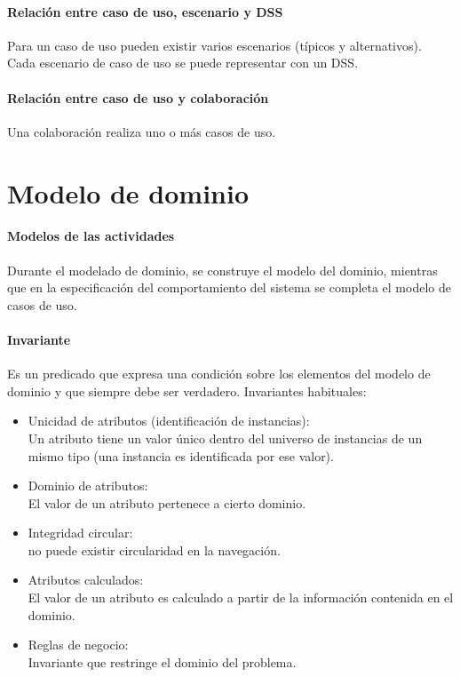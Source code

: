 \documentclass[a4paper,12pt,oneside]{report}
\begin{document}
        \paragraph{Relaci\'on entre caso de uso, escenario y DSS}
          Para un caso de uso pueden existir varios escenarios (t\'ipicos y
          alternativos).\\
          Cada escenario de caso de uso se puede representar con un DSS.

        \paragraph{Relaci\'on entre caso de uso y colaboraci\'on}
          Una colaboraci\'on realiza uno o m\'as casos de uso.


    \section{Modelo de dominio}
        \paragraph{Modelos de las actividades}
          Durante el modelado de dominio, se construye el modelo del dominio, mientras
          que en la especificaci\'on del comportamiento del sistema se completa el
          modelo de casos de uso.

        \paragraph{Invariante}
          Es un predicado que expresa una condici\'on sobre los elementos del
          modelo de dominio y que siempre debe ser verdadero.
          Invariantes habituales:
          \begin{itemize}
            \item Unicidad de atributos (identificaci\'on de instancias):\\
                    Un atributo tiene un valor \'unico dentro del universo de instancias
                    de un mismo tipo (una instancia es identificada por ese valor).
            \item Dominio de atributos:\\
                    El valor de un atributo pertenece a cierto dominio.
            \item Integridad circular:\\
                    no puede existir circularidad en la navegaci\'on.
            \item Atributos calculados:\\
                    El valor de un atributo es calculado a partir de la informaci\'on
                    contenida en el dominio.
            \item Reglas de negocio:\\
                    Invariante que restringe el dominio del problema.
          \end{itemize}
\end{document}
